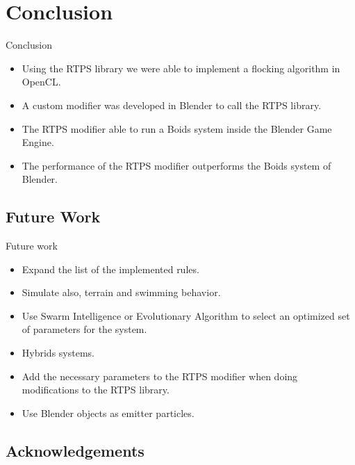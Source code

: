 \documentclass[red]{beamer}
\begin{document}
\section{Conclusion}
\begin{frame}{Conclusion}
	\begin{itemize}
		\item Using the RTPS library we were able to implement a flocking algorithm in OpenCL.
		\item A custom modifier was developed in Blender to call the RTPS library.
		\item The RTPS modifier able to run a Boids system inside the Blender Game Engine.
		\item The performance of the RTPS modifier outperforms the Boids system of Blender.
	\end{itemize}
\end{frame}

\subsection{Future Work}
\begin{frame}{Future work}
	\begin{itemize}
		\item Expand the list of the implemented rules.
		\item Simulate also, terrain and swimming behavior.
		\item Use Swarm Intelligence or Evolutionary Algorithm to select an optimized set of parameters for the system.
		\item Hybrids systems.
		\item Add the necessary parameters to the RTPS modifier when doing modifications to the RTPS library.
		\item Use Blender objects as emitter particles.
	\end{itemize}
\end{frame}

\subsection{Acknowledgements}
\end{document}
